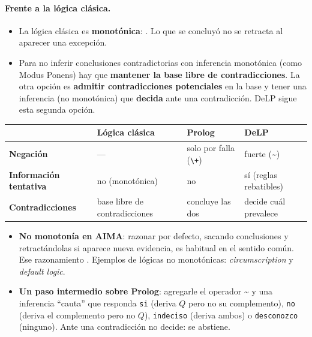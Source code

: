 \documentclass[11pt,a4paper]{article}
\newcommand{\nf}{\textasciitilde}                 %
\begin{document}
\paragraph{Frente a la lógica clásica.}
\begin{itemize}
  \item La lógica clásica es \textbf{monotónica}: . Lo que se concluyó no se retracta al aparecer una excepción.
  \item Para no inferir conclusiones contradictorias con inferencia monotónica (como Modus Ponens) hay que \textbf{mantener la base libre de contradicciones}. La otra opción es \textbf{admitir contradicciones potenciales} en la base y tener una inferencia (no monotónica) que \textbf{decida} ante una contradicción. DeLP sigue esta segunda opción.
\end{itemize}

\begin{center}
\small
\begin{tabularx}{\linewidth}{@{}>{\bfseries}l X X X@{}}
\toprule
 & \textbf{Lógica clásica} & \textbf{Prolog} & \textbf{DeLP} \\
\midrule
Negación & --- & solo por falla (\texttt{\textbackslash+}) & fuerte (\nf) \\
Información tentativa & no (monotónica) & no & sí (reglas rebatibles) \\
Contradicciones & base libre de contradicciones & concluye las dos & decide cuál prevalece \\
\bottomrule
\end{tabularx}
\end{center}

\begin{extras}
\begin{itemize}
  \item \textbf{No monotonía en AIMA}: razonar por defecto, sacando conclusiones  y retractándolas si aparece nueva evidencia, es habitual en el sentido común. Ese razonamiento . Ejemplos de lógicas no monotónicas: \textit{circumscription} y \textit{default logic}.
  \item \textbf{Un paso intermedio sobre Prolog}: agregarle el operador \nf{} y una inferencia ``cauta'' que responda \texttt{si} (deriva $Q$ pero no su complemento), \texttt{no} (deriva el complemento pero no $Q$), \texttt{indeciso} (deriva ambos) o \texttt{desconozco} (ninguno). Ante una contradicción no decide: se abstiene.
\end{itemize}
\end{extras}
\end{document}
